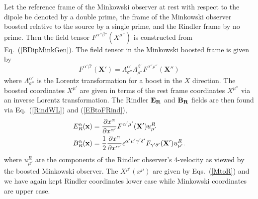 Let the reference frame of the Minkowski observer at rest with
respect to the dipole be denoted by a double prime, the frame of the 
Minkowski observer boosted relative to the source by a single prime, and the Rindler frame by no
prime. Then the field tensor $F^{\alpha'' \beta''} (X^{\mu''})$ is
constructed from Eq.\ (\ref{BDipMinkGen}). The field tensor in the
Minkowski boosted frame is given by
\begin{equation}
 F^{\alpha' \beta'} (\mathbf{X'}) = \Lambda^{\alpha'}_{\sigma''} \Lambda^{\beta'}_{\rho''} F^{\sigma'' \rho''} (\mathbf{X''})
 \label{LLFboost}
\end{equation}
where $\Lambda^{\alpha'}_{\sigma''}$  is the Lorentz transformation for a boost in the $X$ direction. The boosted coordinates $X^{\mu'}$ are given in terms of the rest frame coordinates $X^{\mu''}$ via an inverse Lorentz transformation. The Rindler $\bf{E_R}$ and $\bf{B_R}$ fields are then found via Eq.\  (\ref{RindWL}) and (\ref{EBtoFRind}),
\begin{align}
E_R^{\alpha} (\bf{x}) &= \frac{\partial x^{\alpha}}{\partial x^{\alpha'}} F^{\alpha' \mu'} {(\bf{X'})} u^R_{\mu'}   \nonumber \\  
B_R^{\alpha} (\bf{x}) &= \frac{1}{2} \frac{\partial x^{\alpha}}{\partial x^{\alpha'}} \epsilon^{\alpha' \mu' \gamma' \delta'}F_{\gamma' \delta'}(\mathbf{X'}) u^R_{\mu'}.
\label{EBRindfromFB}
\end{align}
where $u^R_{\mu'}$ are the components of the Rindler observer's
4-velocity as viewed by the boosted Minkowski observer. 
The $X^{\mu'}(x^{\mu})$ are given by Eqs.\  (\ref{MtoR}) and we have
again kept Rindler coordinates lower case while Minkowski coordinates
are upper case. 


